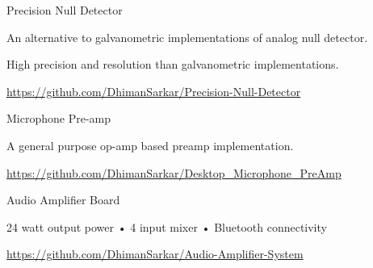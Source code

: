 \begin{cventries}
  \cventry
    {Precision Null Detector} %
    {} %
    {} %
    {} %
    {
      \begin{cvitems} %
        \item {An alternative to galvanometric implementations of analog null detector.}
        \item{High precision and resolution than galvanometric implementations.}
        \item {\href{https://github.com/DhimanSarkar/Precision-Null-Detector}{https://github.com/DhimanSarkar/Precision-Null-Detector}}
      \end{cvitems}
    }


  \cventry
    {Microphone Pre-amp} %
    {} %
    {} %
    {} %
    {
      \begin{cvitems} %
        \item {A general purpose op-amp based preamp implementation.}
        \item {\href{https://github.com/DhimanSarkar/Desktop_Microphone_PreAmp}{https://github.com/DhimanSarkar/Desktop\_Microphone\_PreAmp}}
      \end{cvitems}
    }



  \cventry
    {Audio Amplifier Board} %
    {} %
    {} %
    {} %
    {
      \begin{cvitems} %
        \item {24 watt output power • 4 input mixer • Bluetooth connectivity}
        \item {\href{https://github.com/DhimanSarkar/Audio-Amplifier-System}{https://github.com/DhimanSarkar/Audio-Amplifier-System}}
      \end{cvitems}
    }
\end{cventries}
